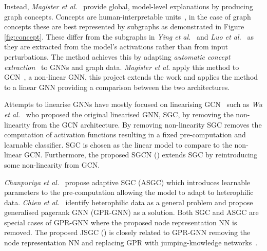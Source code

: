 Instead, \textit{Magister et al.}~\cite{magister2021gcexplainer} provide global, model-level explanations by producing graph concepts.
Concepts are human-interpretable units~\cite{ghorbani2019towards}, in the case of graph concepts these are best represented by subgraphs as demonstrated in Figure \ref{fig:concept}.
These differ from the subgraphs in \textit{Ying et al.}~\cite{ying2019gnnexplainer} and \textit{Luo et al.}~\cite{luo2020parameterized} as they are extracted from the model's activations rather than from input perturbations.
The method achieves this by adapting \textit{automatic concept extraction}~\cite{ghorbani2019towards} to GNNs and graph data.
\textit{Magister et al.} apply this method to GCN~\cite{kipf2016semi}, a non-linear GNN, this project extends the work and applies the method to a linear GNN providing a comparison between the two architectures.

Attempts to linearise GNNs have mostly focused on linearising GCN~\cite{kipf2016semi} such as \textit{Wu et al.}~\cite{wu2019simplifying} who proposed the original linearised GNN, SGC, by removing the non-linearity from the GCN architecture.
By removing non-linearity SGC removes the computation of activation functions resulting in a fixed pre-computation and learnable classifier.
SGC is chosen as the linear model to compare to the non-linear GCN.
Furthermore, the proposed SGCN () extends SGC by reintroducing some non-linearity from GCN.

\textit{Chanpuriya et al.}~\cite{chanpuriya2022simplified} propose adaptive SGC (ASGC) which introduces learnable parameters to the pre-computation allowing the model to adapt to heterophilic data.
\textit{Chien et al.}~\cite{chien2020adaptive} identify heterophilic data as a general problem and propose generalised pagerank GNN (GPR-GNN) as a solution.
Both SGC and ASGC are special cases of GPR-GNN where the proposed node representation NN is removed.
The proposed JSGC () is closely related to GPR-GNN removing the node representation NN and replacing GPR with jumping-knowledge networks~\cite{xu2018representation}.

